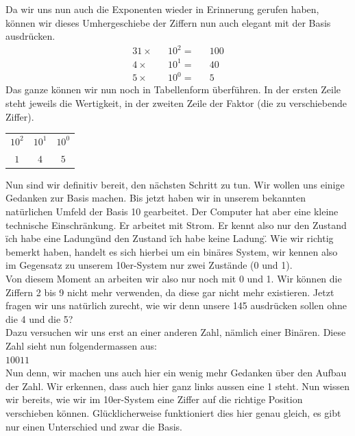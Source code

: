Da wir uns nun auch die Exponenten wieder in Erinnerung gerufen haben, können wir dieses Umhergeschiebe der Ziffern
nun auch elegant mit der Basis ausdrücken.
\begin{alignat*}{3}
    1 \times && 10^2 = && 100\\
    4 \times && 10^1 = && 40\\
    5 \times && 10^0 = && 5
\end{alignat*}
Das ganze können wir nun noch in Tabellenform überführen. In der ersten Zeile steht jeweils die Wertigkeit, in der
zweiten Zeile der Faktor (die zu verschiebende Ziffer).\\
\begin{tabular}{ c c c }
    $10^2$ & $10^1$ & $10^0$ \\
    $1$    & $4$    & $5$
\end{tabular}

Nun sind wir definitiv bereit, den nächsten Schritt zu tun. Wir wollen uns einige Gedanken zur Basis machen. Bis jetzt
haben wir in unserem bekannten natürlichen Umfeld der Basis 10 gearbeitet. Der Computer hat aber eine kleine technische
Einschränkung. Er arbeitet mit Strom. Er kennt also nur den Zustand \"ich habe eine Ladung\" und den Zustand \"ich habe
keine Ladung\". Wie wir richtig bemerkt haben, handelt es sich hierbei um ein binäres System, wir kennen also im Gegensatz
zu unserem 10er-System nur zwei Zustände (0 und 1).\\
Von diesem Moment an arbeiten wir also nur noch mit 0 und 1. Wir können die Ziffern 2 bis 9 nicht mehr verwenden, da diese
gar nicht mehr existieren. Jetzt fragen wir uns natürlich zurecht, wie wir denn unsere 145 ausdrücken sollen ohne die 4 und die 5?\\
Dazu versuchen wir uns erst an einer anderen Zahl, nämlich einer Binären. Diese Zahl sieht nun folgendermassen aus:\\
$10011$\\
Nun denn, wir machen uns auch hier ein wenig mehr Gedanken über den Aufbau der Zahl. Wir erkennen, dass auch hier ganz
links aussen eine 1 steht. Nun wissen wir bereits, wie wir im 10er-System eine Ziffer auf die richtige Position verschieben
können. Glücklicherweise funktioniert dies hier genau gleich, es gibt nur einen Unterschied und zwar die Basis.\\

